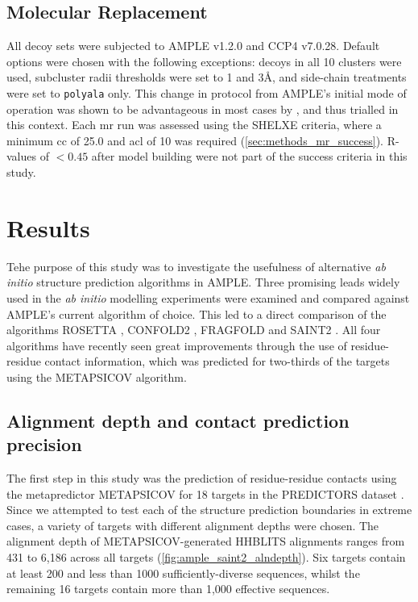 \subsection{Molecular Replacement}
All decoy sets were subjected to AMPLE v1.2.0 and CCP4 v7.0.28. Default options were chosen with the following exceptions: decoys in all 10 clusters were used, subcluster radii thresholds were set to 1 and 3\AA, and side-chain treatments were set to \texttt{polyala} only. This change in protocol from AMPLE's initial mode of operation \cite{Bibby2012-lm} was shown to be advantageous in most cases by \textcite{Thomas2017-qu}, and thus trialled in this context.  Each \gls{mr} run was assessed using the SHELXE criteria, where a minimum \gls{cc} of 25.0 and \gls{acl} of 10 was required (\cref{sec:methods_mr_success}). R-values of $<0.45$ after model building were not part of the success criteria in this study.

\section{Results}
Tehe purpose of this study was to investigate the usefulness of alternative \textit{ab initio} structure prediction algorithms in AMPLE. Three promising leads widely used in the \textit{ab initio} modelling experiments were examined and compared against AMPLE's current algorithm of choice. This led to a direct comparison of the algorithms ROSETTA \cite{Rohl2004-dj}, CONFOLD2 \cite{Adhikari2018-lj}, FRAGFOLD \cite{Jones2001-mc} and SAINT2 \cite{De_Oliveira2017-sg}. All four algorithms have recently seen great improvements through the use of residue-residue contact information, which was predicted for two-thirds of the targets using the METAPSICOV \cite{Jones2015-vq} algorithm.

\subsection{Alignment depth and contact prediction precision}
The first step in this study was the prediction of residue-residue contacts using the metapredictor METAPSICOV for 18 targets in the PREDICTORS dataset \cite{Jones2015-vq}. Since we attempted to test each of the structure prediction boundaries in extreme cases, a variety of targets with different alignment depths were chosen. The alignment depth of METAPSICOV-generated HHBLITS alignments ranges from 431 to 6,186 across all targets (\cref{fig:ample_saint2_alndepth}). Six targets contain at least 200 and less than 1000 sufficiently-diverse sequences, whilst the remaining 16 targets contain more than 1,000 effective sequences.

